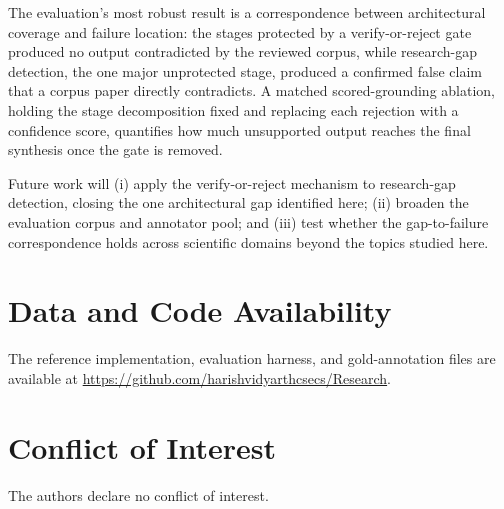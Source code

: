 \documentclass[11pt]{article}
\begin{document}
The evaluation's most robust result is a correspondence between architectural
coverage and failure location: the stages protected by a verify-or-reject gate
produced no output contradicted by the reviewed corpus, while research-gap
detection, the one major unprotected stage, produced a confirmed false claim
that a corpus paper directly contradicts. A matched scored-grounding ablation,
holding the stage decomposition fixed and replacing each rejection with a
confidence score, %
quantifies how much unsupported output reaches the final synthesis once the gate
is removed.

Future work will (i) apply the verify-or-reject mechanism to research-gap
detection, closing the one architectural gap identified here; (ii) broaden the
evaluation corpus and annotator pool; and (iii) test whether the gap-to-failure
correspondence holds across scientific domains beyond the topics studied here.

\section*{Data and Code Availability}

The reference implementation, evaluation harness, and gold-annotation files are
available at \url{https://github.com/harishvidyarthcsecs/Research}.

\section*{Conflict of Interest}

The authors declare no conflict of interest.



\end{document}
